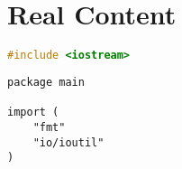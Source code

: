 \documentclass{book}
\begin{document}


\chapter{Real Content}






\begin{lstlisting}[language=C++, caption={Cpp Testing}]
#include <iostream>
\end{lstlisting}







\begin{lstlisting}[caption={Golang Program}]
package main

import (
	"fmt"
	"io/ioutil"
)
\end{lstlisting}


\end{document}
